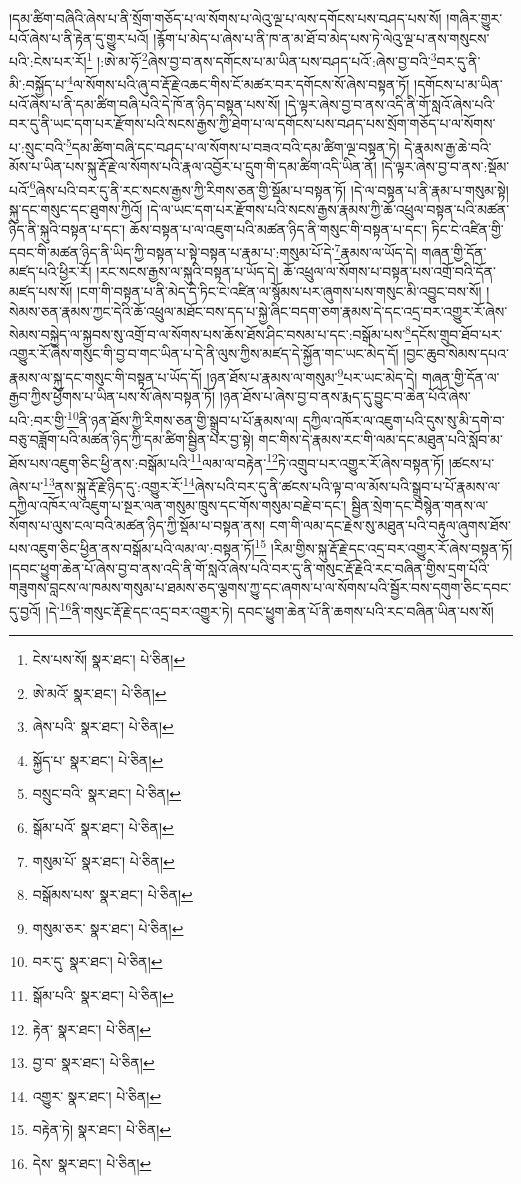 །དམ་ཚིག་བཞིའི་ཞེས་པ་ནི་སྲོག་གཅོད་པ་ལ་སོགས་པ་ལེའུ་ལྔ་པ་ལས་དགོངས་པས་བཤད་པས་སོ། །གཞིར་གྱུར་པའོ་ཞེས་པ་ནི་རྟེན་དུ་གྱུར་པའོ། །རྙོག་པ་མེད་པ་ཞེས་པ་ནི་ཁ་ན་མ་ཐོ་བ་མེད་པས་ཏེ་ལེའུ་ལྔ་པ་ནས་གསུངས་པའི་:ངེས་པར་རོ།\footnote{ངེས་པས་སོ།  སྣར་ཐང་།  པེ་ཅིན། } །:ཨེ་མ་ཧོ་\footnote{ཨེ་མའོ་  སྣར་ཐང་།  པེ་ཅིན། }ཞེས་བྱ་བ་ནས་དགོངས་པ་མ་ཡིན་པས་བཤད་པའོ་:ཞེས་བྱ་བའི་\footnote{ཞེས་པའི་  སྣར་ཐང་།  པེ་ཅིན། }བར་དུ་ནི་མི་:བསྐྱོད་པ་\footnote{སྐྱོད་པ་  སྣར་ཐང་།  པེ་ཅིན། }ལ་སོགས་པའི་ཞུ་བ་རྡོ་རྗེ་འཆང་གིས་ངོ་མཚར་བར་དགོངས་སོ་ཞེས་བསྟན་ཏོ། །དགོངས་པ་མ་ཡིན་པའོ་ཞེས་པ་ནི་དམ་ཚིག་བཞི་པའི་དེ་ཁོ་ན་ཉིད་བསྟན་པས་སོ། །དེ་ལྟར་ཞེས་བྱ་བ་ནས་འདི་ནི་གོ་སླའོ་ཞེས་པའི་བར་དུ་ནི་ཡང་དག་པར་རྫོགས་པའི་སངས་རྒྱས་ཀྱི་ཐེག་པ་ལ་དགོངས་པས་བཤད་པས་སྲོག་གཅོད་པ་ལ་སོགས་པ་:སྲུང་བའི་\footnote{བསྲུང་བའི་  སྣར་ཐང་།  པེ་ཅིན། }དམ་ཚིག་བཞི་དང་བཤད་པ་ལ་སོགས་པ་བཟའ་བའི་དམ་ཚིག་ལྔ་བསྟན་ཏེ། དེ་རྣམས་རྒྱ་ཆེ་བའི་མོས་པ་ཡིན་པས་སྐུ་རྡོ་རྗེ་ལ་སོགས་པའི་རྣལ་འབྱོར་པ་དྲུག་གི་དམ་ཚིག་འདི་ཡིན་ནོ། །དེ་ལྟར་ཞེས་བྱ་བ་ནས་:སྡོམ་པའོ་\footnote{སྒོམ་པའོ་  སྣར་ཐང་།  པེ་ཅིན། }ཞེས་པའི་བར་དུ་ནི་རང་སངས་རྒྱས་ཀྱི་རིགས་ཅན་གྱི་སྡོམ་པ་བསྟན་ཏོ། །དེ་ལ་བསྟན་པ་ནི་རྣམ་པ་གསུམ་སྟེ། སྐུ་དང་གསུང་དང་ཐུགས་ཀྱིའོ། །དེ་ལ་ཡང་དག་པར་རྫོགས་པའི་སངས་རྒྱས་རྣམས་ཀྱི་ཆོ་འཕྲུལ་བསྟན་པའི་མཚན་ཉིད་ནི་སྐུའི་བསྟན་པ་དང་། ཆོས་བསྟན་པ་ལ་འཇུག་པའི་མཚན་ཉིད་ནི་གསུང་གི་བསྟན་པ་དང་། ཏིང་ངེ་འཛིན་གྱི་དབང་གི་མཚན་ཉིད་ནི་ཡིད་ཀྱི་བསྟན་པ་སྟེ་བསྟན་པ་རྣམ་པ་:གསུམ་པོ་དེ་\footnote{གསུམ་པོ་  སྣར་ཐང་།  པེ་ཅིན། }རྣམས་ལ་ཡོད་དེ། གཞན་གྱི་དོན་མཛད་པའི་ཕྱིར་རོ། །རང་སངས་རྒྱས་ལ་སྐུའི་བསྟན་པ་ཡོད་དེ། ཆོ་འཕྲུལ་ལ་སོགས་པ་བསྟན་པས་འགྲོ་བའི་དོན་མཛད་པས་སོ། །ངག་གི་བསྟན་པ་ནི་མེད་དེ་ཏིང་ངེ་འཛིན་ལ་སྙོམས་པར་ཞུགས་པས་གསུང་མི་འབྱུང་བས་སོ། །སེམས་ཅན་རྣམས་ཀྱང་དེའི་ཆོ་འཕྲུལ་མཐོང་བས་དད་པ་སྐྱེ་ཞིང་བདག་ཅག་རྣམས་དེ་དང་འདྲ་བར་འགྱུར་རོ་ཞེས་སེམས་བསྐྱེད་ལ་སྐྱབས་སུ་འགྲོ་བ་ལ་སོགས་པས་ཆོས་ཐོས་ཤིང་བསམ་པ་དང་:བསྒོམ་པས་\footnote{བསྒོམས་པས་  སྣར་ཐང་།  པེ་ཅིན། }དངོས་གྲུབ་ཐོབ་པར་འགྱུར་རོ་ཞེས་གསུང་གི་བྱ་བ་གང་ཡིན་པ་དེ་ནི་ལུས་ཀྱིས་མཛད་དེ་སྐྱོན་གང་ཡང་མེད་དོ། །བྱང་ཆུབ་སེམས་དཔའ་རྣམས་ལ་སྐུ་དང་གསུང་གི་བསྟན་པ་ཡོད་དོ། །ཉན་ཐོས་པ་རྣམས་ལ་གསུམ་\footnote{གསུམ་ཅར་  སྣར་ཐང་།  པེ་ཅིན། }པར་ཡང་མེད་དེ། གཞན་གྱི་དོན་ལ་རྒྱབ་ཀྱིས་ཕྱོགས་པ་ཡིན་པས་སོ་ཞེས་བསྟན་ཏོ། །ཉན་ཐོས་པ་ཞེས་བྱ་བ་ནས་རྨད་དུ་བྱུང་བ་ཆེན་པོའོ་ཞེས་པའི་:བར་གྱི་\footnote{བར་དུ་  སྣར་ཐང་།  པེ་ཅིན། }ནི་ཉན་ཐོས་ཀྱི་རིགས་ཅན་གྱི་སྒྲུབ་པ་པོ་རྣམས་ལ། དཀྱིལ་འཁོར་ལ་འཇུག་པའི་དུས་སུ་མི་དགེ་བ་བཅུ་བཟློག་པའི་མཚན་ཉིད་ཀྱི་དམ་ཚིག་སྦྱིན་པར་བྱ་སྟེ། གང་གིས་དེ་རྣམས་རང་གི་ལམ་དང་མཐུན་པའི་སློབ་མ་ཐོས་པས་འཇུག་ཅིང་ཕྱི་ནས་:བསྒོམ་པའི་\footnote{སྒོམ་པའི་  སྣར་ཐང་།  པེ་ཅིན། }ལམ་ལ་བརྟེན་\footnote{རྟེན་  སྣར་ཐང་།  པེ་ཅིན། }ཏེ་འགྲུབ་པར་འགྱུར་རོ་ཞེས་བསྟན་ཏོ། །ཚངས་པ་ཞེས་པ་\footnote{བྱ་བ་  སྣར་ཐང་།  པེ་ཅིན། }ནས་སྐུ་རྡོ་རྗེ་ཉིད་དུ་:འགྱུར་རོ་\footnote{འགྱུར་  སྣར་ཐང་།  པེ་ཅིན། }ཞེས་པའི་བར་དུ་ནི་ཚངས་པའི་ལྟ་བ་ལ་མོས་པའི་སྒྲུབ་པ་པོ་རྣམས་ལ་དཀྱིལ་འཁོར་ལ་འཇུག་པ་སྔར་ལན་གསུམ་ཁྲུས་དང་གོས་གསུམ་བརྗེ་བ་དང་། སྦྱིན་སྲེག་དང་བསྙེན་གནས་ལ་སོགས་པ་ལུས་ངལ་བའི་མཚན་ཉིད་ཀྱི་སྡོམ་པ་བསྟན་ནས། ངག་གི་ལམ་དང་རྗེས་སུ་མཐུན་པའི་བརྟུལ་ཞུགས་ཐོས་པས་འཇུག་ཅིང་ཕྱིན་ནས་བསྒོམ་པའི་ལམ་ལ་:བསྟན་ཏོ།\footnote{བརྟེན་ཏེ།  སྣར་ཐང་།  པེ་ཅིན། } །རིམ་གྱིས་སྐུ་རྡོ་རྗེ་དང་འདྲ་བར་འགྱུར་རོ་ཞེས་བསྟན་ཏོ། །དབང་ཕྱུག་ཆེན་པོ་ཞེས་བྱ་བ་ནས་འདི་ནི་གོ་སླའོ་ཞེས་པའི་བར་དུ་ནི་གསུང་རྡོ་རྗེའི་རང་བཞིན་གྱིས་དྲག་པོའི་གཟུགས་བླངས་ལ་ཁམས་གསུམ་པ་ཐམས་ཅད་ལྕགས་ཀྱུ་དང་ཞགས་པ་ལ་སོགས་པའི་སྦྱོར་བས་དགུག་ཅིང་དབང་དུ་བྱའོ། །དེ་\footnote{དེས་  སྣར་ཐང་།  པེ་ཅིན། }ནི་གསུང་རྡོ་རྗེ་དང་འདྲ་བར་འགྱུར་ཏེ། དབང་ཕྱུག་ཆེན་པོ་ནི་ཆགས་པའི་རང་བཞིན་ཡིན་པས་སོ། 